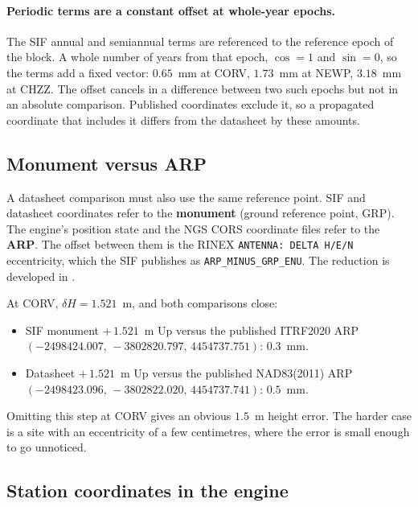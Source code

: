 \documentclass[main.tex]{subfiles}
\begin{document}
\paragraph{Periodic terms are a constant offset at whole-year epochs.}
The SIF annual and semiannual terms are referenced to the reference
epoch of the block.  A whole number of years from that epoch,
$\cos = 1$ and $\sin = 0$, so the terms add a fixed vector: $0.65$~mm at
CORV, $1.73$~mm at NEWP, $3.18$~mm at CHZZ.  The offset cancels in a
difference between two such epochs but not in an absolute comparison.
Published coordinates exclude it, so a propagated coordinate that
includes it differs from the datasheet by these amounts.

\subsection{Monument versus ARP}\label{sec:trf-arp}

A datasheet comparison must also use the same reference point.  SIF and
datasheet coordinates refer to the \textbf{monument} (ground reference
point, GRP).  The engine's position state and the NGS CORS coordinate
files refer to the \textbf{ARP}.  The offset between them is the RINEX
\texttt{ANTENNA: DELTA H/E/N} eccentricity, which the SIF publishes as
\texttt{ARP\_MINUS\_GRP\_ENU}.  The reduction is developed in
.

At CORV, $\delta H = 1.521$~m, and both comparisons close:
\begin{itemize}[leftmargin=*]
\item SIF monument $+\,1.521$~m Up versus the published ITRF2020 ARP
      $(-2498424.007,\,-3802820.797,\,4454737.751)$: $0.3$~mm.
\item Datasheet $+\,1.521$~m Up versus the published NAD83(2011) ARP
      $(-2498423.096,\,-3802822.020,\,4454737.741)$: $0.5$~mm.
\end{itemize}
Omitting this step at CORV gives an obvious $1.5$~m height error.  The
harder case is a site with an eccentricity of a few centimetres, where
the error is small enough to go unnoticed.

\subsection{Station coordinates in the engine}\label{sec:trf-engine}
\end{document}
